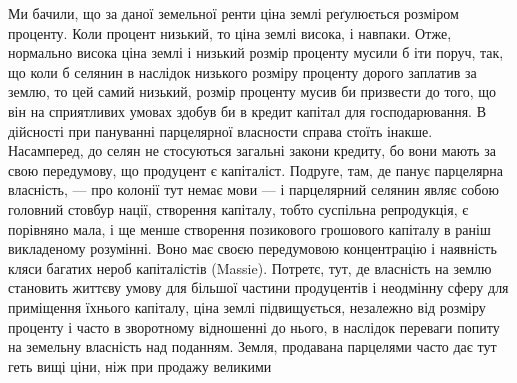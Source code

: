 Ми бачили, що за даної земельної ренти ціна землі реґулюється розміром проценту.
Коли процент низький, то ціна землі висока, і навпаки. Отже, нормально висока
ціна землі і низький розмір проценту мусили б іти поруч, так, що коли б селянин
в наслідок низького розміру проценту дорого заплатив за землю, то цей самий низький,
розмір проценту мусив би призвести до того, що він на сприятливих умовах здобув би в кредит капітал
для господарювання. В дійсності при пануванні парцелярної
власности справа стоїть інакше. Насамперед, до селян не стосуються загальні закони
кредиту, бо вони мають за свою передумову, що продуцент є капіталіст.
Подруге, там, де панує парцелярна власність, — про колонії тут немає мови —
і парцелярний селянин являє собою головний стовбур нації, створення капіталу,
тобто суспільна репродукція, є порівняно мала, і ще менше створення позикового
грошового капіталу в раніш викладеному розумінні. Воно має своєю передумовою
концентрацію і наявність кляси багатих нероб капіталістів (Massie). Потретє, тут,
де власність на землю становить життєву умову для більшої частини продуцентів
і неодмінну сферу для приміщення їхнього капіталу, ціна землі підвищується,
незалежно від розміру проценту і часто в зворотному відношенні до
нього, в наслідок переваги попиту на земельну власність над поданням. Земля,
продавана парцелями часто дає тут геть вищі ціни, ніж при продажу великими
\parbreak{}  %
